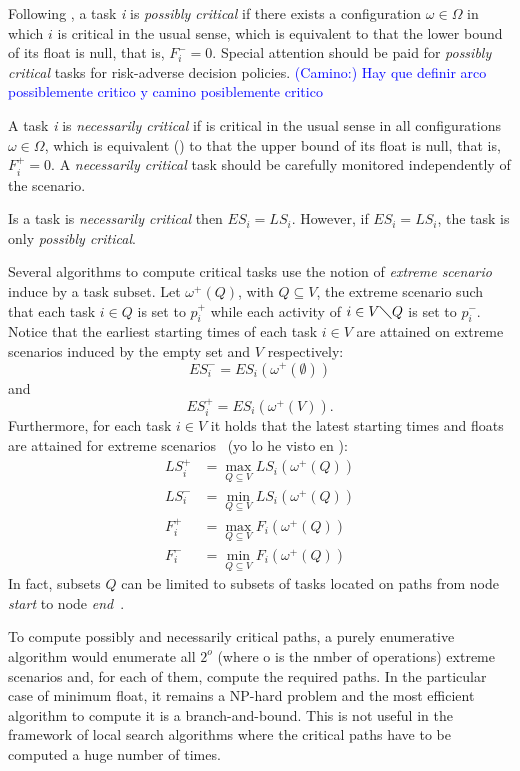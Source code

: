 \documentclass[preprint]{elsarticle}
\newcommand{\textcam}[1]{\textcolor{blue}{(Camino:) #1}}
\begin{document}
 Following \cite{Dubois2005}, a task \textit{i} is \textit{possibly critical} if there exists a configuration $\omega \in \Omega$ in which $i$ is critical in the usual sense, which is equivalent to that the lower bound of its float is null, that is, $F_i^- = 0$. Special attention should be paid for \textit{possibly critical} tasks for risk-adverse decision policies. \textcam{Hay que definir arco possiblemente critico y camino posiblemente critico}

A task \textit{i} is \textit{necessarily critical} if is critical in the usual sense in all configurations $\omega \in \Omega$, which is equivalent (\cite{Dubois2005}) to that the upper bound of its float is null, that is, $F_i^+ = 0$. A \textit{necessarily critical} task should be carefully monitored independently of the scenario.

Is a task is \textit{necessarily critical} then $ES_i=LS_i$. However, if $ES_i=LS_i$, the task is only \textit{possibly critical}.

Several algorithms to compute critical tasks use the notion of \textit{extreme scenario} induce by a task subset. Let $\omega^+(Q)$, with $Q \subseteq V$, the extreme scenario such that each task $i \in Q$ is set to $p_i^+$ while each activity of $i \in V \diagdown Q$ is set to $p_i^-$. Notice that the earliest starting times of each task $i \in V$ are attained on extreme scenarios induced by the empty set and $V$ respectively: $$ES_i^- = ES_i(\omega^+(\emptyset))$$ and  $$ES_i^+ = ES_i(\omega^+(V)).$$ Furthermore, for each task $i \in V$ it holds that the latest starting times and floats are attained for extreme scenarios~\cite{Dubois2003} (yo lo he visto en \cite{Artigues2015}):
\begin{align*}
LS_i^+ & = \max_{Q \subseteq V} LS_i(\omega^+(Q)) \\
LS_i^- & = \min_{Q \subseteq V} LS_i(\omega^+(Q)) \\
F_i^+ & = \max_{Q \subseteq V} F_i(\omega^+(Q)) \\
F_i^- & = \min_{Q \subseteq V} F_i(\omega^+(Q))
\end{align*}
In fact, subsets $Q$ can be limited to subsets of tasks located on paths from node \textit{start} to node \textit{end}~\cite{Dubois2005}.

To compute possibly and necessarily critical paths, a purely enumerative algorithm would enumerate all $2^o$ (where o is the nmber of operations) extreme scenarios and, for each of them, compute the required paths. In the particular case of minimum float, it remains a NP-hard problem \cite{Artigues2015} and the most efficient algorithm to compute it is a branch-and-bound. This is not useful in the framework of local search algorithms where the critical paths have to be computed a huge number of times.
\end{document}
